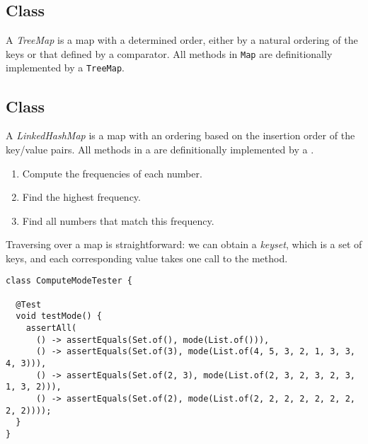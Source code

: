 \subsection*{ Class}
A \textit{TreeMap} is a map with a determined order, either by a natural ordering of the keys or that defined by a comparator. All methods in \texttt{Map} are definitionally implemented by a \texttt{TreeMap}.

\subsection*{ Class}
A \textit{LinkedHashMap} is a map with an ordering based on the insertion order of the key/value pairs. All methods in a  are definitionally implemented by a .


\begin{enumerate}
  \item Compute the frequencies of each number.
  \item Find the highest frequency.
  \item Find all numbers that match this frequency.
\end{enumerate}

Traversing over a map is straightforward: we can obtain a \textit{keyset}, which is a set of keys, and each corresponding value takes one call to the  method.

\begin{cl}[]{}
\begin{lstlisting}[language=MyJava]
class ComputeModeTester {

  @Test
  void testMode() {
    assertAll(
      () -> assertEquals(Set.of(), mode(List.of())),  
      () -> assertEquals(Set.of(3), mode(List.of(4, 5, 3, 2, 1, 3, 3, 4, 3))),
      () -> assertEquals(Set.of(2, 3), mode(List.of(2, 3, 2, 3, 2, 3, 1, 3, 2))),
      () -> assertEquals(Set.of(2), mode(List.of(2, 2, 2, 2, 2, 2, 2, 2, 2))));
  }
}
\end{lstlisting}
\end{cl}

